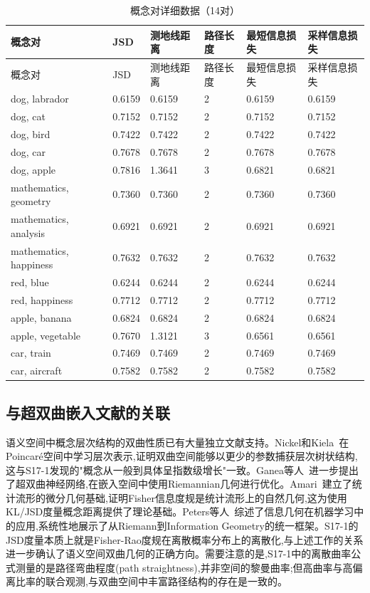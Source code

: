 \documentclass[UTF8,fontset=mac]{ctexart}
\begin{document}
\begin{longtable}[]{@{}llllll@{}}
\caption{概念对详细数据（14对）}\tabularnewline
\toprule\noalign{}
概念对 & JSD & 测地线距离 & 路径长度 & 最短信息损失 & 采样信息损失 \\
\midrule\noalign{}
\endfirsthead
\toprule\noalign{}
概念对 & JSD & 测地线距离 & 路径长度 & 最短信息损失 & 采样信息损失 \\
\midrule\noalign{}
\endhead
\bottomrule\noalign{}
\endlastfoot
dog, labrador & 0.6159 & 0.6159 & 2 & 0.6159 & 0.6159 \\
dog, cat & 0.7152 & 0.7152 & 2 & 0.7152 & 0.7152 \\
dog, bird & 0.7422 & 0.7422 & 2 & 0.7422 & 0.7422 \\
dog, car & 0.7678 & 0.7678 & 2 & 0.7678 & 0.7678 \\
dog, apple & 0.7816 & 1.3641 & 3 & 0.6821 & 0.6821 \\
mathematics, geometry & 0.7360 & 0.7360 & 2 & 0.7360 & 0.7360 \\
mathematics, analysis & 0.6921 & 0.6921 & 2 & 0.6921 & 0.6921 \\
mathematics, happiness & 0.7632 & 0.7632 & 2 & 0.7632 & 0.7632 \\
red, blue & 0.6244 & 0.6244 & 2 & 0.6244 & 0.6244 \\
red, happiness & 0.7712 & 0.7712 & 2 & 0.7712 & 0.7712 \\
apple, banana & 0.6824 & 0.6824 & 2 & 0.6824 & 0.6824 \\
apple, vegetable & 0.7670 & 1.3121 & 3 & 0.6561 & 0.6561 \\
car, train & 0.7469 & 0.7469 & 2 & 0.7469 & 0.7469 \\
car, aircraft & 0.7582 & 0.7582 & 2 & 0.7582 & 0.7582 \\
\end{longtable}

\subsection{与超双曲嵌入文献的关联}\label{hyperbolic-embeddings}

语义空间中概念层次结构的双曲性质已有大量独立文献支持。Nickel和Kiela~\cite{nickel-kiela-2017}在Poincaré空间中学习层次表示,证明双曲空间能够以更少的参数捕获层次树状结构,这与S17-1发现的"概念从一般到具体呈指数级增长"一致。Ganea等人~\cite{ganea-2018}进一步提出了超双曲神经网络,在嵌入空间中使用Riemannian几何进行优化。Amari~\cite{amari-1985}建立了统计流形的微分几何基础,证明Fisher信息度规是统计流形上的自然几何,这为使用KL/JSD度量概念距离提供了理论基础。Peters等人~\cite{peters-2016}综述了信息几何在机器学习中的应用,系统性地展示了从Riemann到Information Geometry的统一框架。S17-1的JSD度量本质上就是Fisher-Rao度规在离散概率分布上的离散化,与上述工作的关系进一步确认了语义空间双曲几何的正确方向。需要注意的是,S17-1中的离散曲率公式测量的是路径弯曲程度(path straightness),并非空间的黎曼曲率;但高曲率与高偏离比率的联合观测,与双曲空间中丰富路径结构的存在是一致的。
\end{document}

